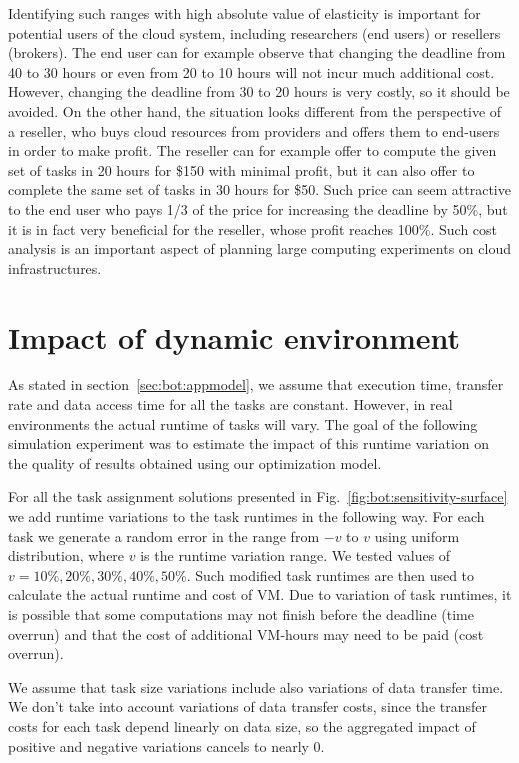 {  Identifying such ranges with high absolute value of elasticity is important
  for potential users of the cloud system, including researchers (end users) or
  resellers (brokers). The end user can for example observe that changing the
  deadline from 40 to 30 hours or even from 20 to 10 hours will not incur much
  additional cost. However, changing the deadline from 30 to 20 hours is very
  costly, so it should be avoided. On the other hand, the situation looks
  different from the perspective of a reseller, who buys cloud resources from
  providers and offers them to end-users in order to make profit. The reseller
  can for example offer to compute the given set of tasks in 20 hours for \$150
  with minimal profit, but it can also offer to complete the same set of tasks
  in 30 hours for \$50. Such price can seem attractive to the end user who pays
  1/3 of the price for increasing the deadline by 50\%, but it is in fact very
  beneficial for the reseller, whose profit reaches 100\%. Such cost analysis
  is an important aspect of planning large computing experiments on cloud
  infrastructures.

\section{Impact of dynamic environment}
\label{sec:bot:dynamic}
    
  As stated in section~\ref{sec:bot:appmodel}, we assume that execution time,
  transfer rate and data access time for all the tasks are constant. However,
  in real environments the actual runtime of tasks will vary. The goal of the
  following simulation experiment was to estimate the impact of this runtime
  variation on the quality of results obtained using our optimization model.
  
  For all the task assignment solutions presented in Fig.~\ref{fig:bot:sensitivity-surface} 
  we add runtime variations to the task runtimes in the following way. For each task
  we generate a random error in the range from $-v$ to $v$ using uniform distribution,
  where $v$ is the runtime variation range. We tested values of $v=10\%, 20\%, 30\%, 40\%, 50\%$. 
  Such modified task runtimes are then used to calculate the actual runtime and cost of 
  VM. Due to variation of task runtimes, it is possible that some computations may not 
  finish before the deadline (time overrun) and that the cost of additional VM-hours
  may need to be paid (cost overrun).

  We assume that task size variations include also
  variations of data transfer time. We don't take into account variations of
  data transfer costs, since the transfer costs for each task depend linearly
  on data size, so the aggregated impact of positive and negative variations
  cancels to nearly $0$.
  
}
